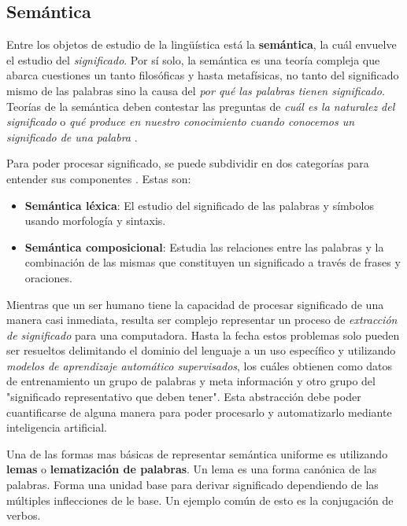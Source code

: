 \subsection{Semántica}

Entre los objetos de estudio de la lingüística está la \textbf{semántica}, la cuál envuelve el estudio del \textit{significado}. Por sí solo, la semántica es una teoría compleja que abarca cuestiones un tanto filosóficas y hasta metafísicas, no tanto del significado mismo de las palabras sino la causa del \textit{por qué las palabras tienen significado}. Teorías de la semántica deben contestar las preguntas de \textit{cuál es la naturalez del significado} o \textit{qué produce en nuestro conocimiento cuando conocemos un significado de una palabra} \parencite{sep-word-meaning}.

Para poder procesar significado, se puede subdividir en dos categorías para entender sus componentes \parencite{dipanjan}. Estas son:

\begin{itemize}
    \item \textbf{Semántica léxica}: El estudio del significado de las palabras y símbolos usando morfología y sintaxis.
    \item \textbf{Semántica composicional}: Estudia las relaciones entre las palabras y la combinación de las mismas que constituyen un significado a través de frases y oraciones.
\end{itemize}

Mientras que un ser humano tiene la capacidad de procesar significado de una manera casi inmediata,  resulta ser complejo representar un proceso de \textit{extracción de significado} para una computadora. Hasta la fecha estos problemas solo pueden ser resueltos delimitando el dominio del lenguaje a un uso específico y utilizando \textit{modelos de aprendizaje automático supervisados}, los cuáles obtienen como datos de entrenamiento un grupo de palabras y meta información y otro grupo del "significado representativo que deben tener". Esta abstracción debe poder cuantificarse de alguna manera para poder procesarlo y automatizarlo mediante inteligencia artificial.

Una de las formas mas básicas de representar semántica uniforme es utilizando \textbf{lemas} o \textbf{lematización de palabras}. Un lema es una forma canónica de las palabras. Forma una unidad base para derivar significado dependiendo de las múltiples inflecciones de le base. Un ejemplo común de esto es la conjugación de verbos.

